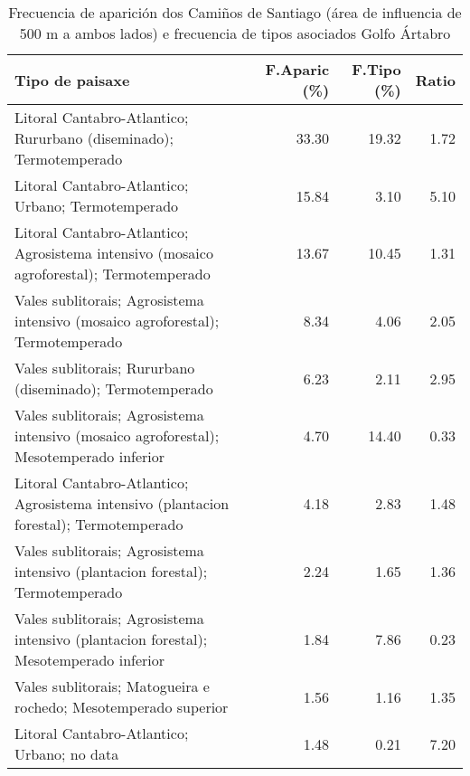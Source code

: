 \begin{table}[p]
\centering
\caption{Frecuencia de aparición dos Camiños de Santiago (área de influencia de 500 m a ambos lados) e frecuencia de tipos asociados Golfo Ártabro} 
\label{vcamino1}
\begin{tabular}{lrrr}
  \hline
Tipo de paisaxe & F.Aparic (\%) & F.Tipo (\%) & Ratio \\ 
  \hline
Litoral Cantabro-Atlantico; Rururbano (diseminado); Termotemperado & 33.30 & 19.32 & 1.72 \\ 
  Litoral Cantabro-Atlantico; Urbano; Termotemperado & 15.84 & 3.10 & 5.10 \\ 
  Litoral Cantabro-Atlantico; Agrosistema intensivo (mosaico agroforestal); Termotemperado & 13.67 & 10.45 & 1.31 \\ 
  Vales sublitorais; Agrosistema intensivo (mosaico agroforestal); Termotemperado & 8.34 & 4.06 & 2.05 \\ 
  Vales sublitorais; Rururbano (diseminado); Termotemperado & 6.23 & 2.11 & 2.95 \\ 
  Vales sublitorais; Agrosistema intensivo (mosaico agroforestal); Mesotemperado inferior & 4.70 & 14.40 & 0.33 \\ 
  Litoral Cantabro-Atlantico; Agrosistema intensivo (plantacion forestal); Termotemperado & 4.18 & 2.83 & 1.48 \\ 
  Vales sublitorais; Agrosistema intensivo (plantacion forestal); Termotemperado & 2.24 & 1.65 & 1.36 \\ 
  Vales sublitorais; Agrosistema intensivo (plantacion forestal); Mesotemperado inferior & 1.84 & 7.86 & 0.23 \\ 
  Vales sublitorais; Matogueira e rochedo; Mesotemperado superior & 1.56 & 1.16 & 1.35 \\ 
  Litoral Cantabro-Atlantico; Urbano; no data & 1.48 & 0.21 & 7.20 \\ 
   \hline
\end{tabular}
\end{table}
